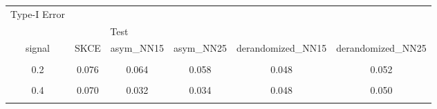 \begin{table}[!h]
\centering\begingroup\fontsize{5}{7}\selectfont

\begin{tabular}{cccccc}
\toprule
\multicolumn{1}{c}{Type-I Error} \\
\cmidrule(l{3pt}r{3pt}){1-1}
\multicolumn{1}{c}{ } & \multicolumn{2}{c}{Test} \\
\cmidrule(l{3pt}r{3pt}){2-3}
signal & SKCE & asym_NN15 & asym_NN25 & derandomized_NN15 & derandomized_NN25\\
\midrule
\cellcolor{gray!10}{0.1} & \cellcolor{gray!10}{0.076} & \cellcolor{gray!10}{0.058} & \cellcolor{gray!10}{0.050} & \cellcolor{gray!10}{0.046} & \cellcolor{gray!10}{0.052}\\
0.2 & 0.076 & 0.064 & 0.058 & 0.048 & 0.052\\
\cellcolor{gray!10}{0.3} & \cellcolor{gray!10}{0.070} & \cellcolor{gray!10}{0.038} & \cellcolor{gray!10}{0.044} & \cellcolor{gray!10}{0.048} & \cellcolor{gray!10}{0.040}\\
0.4 & 0.070 & 0.032 & 0.034 & 0.048 & 0.050\\
\cellcolor{gray!10}{0.5} & \cellcolor{gray!10}{0.076} & \cellcolor{gray!10}{0.046} & \cellcolor{gray!10}{0.050} & \cellcolor{gray!10}{0.030} & \cellcolor{gray!10}{0.044}\\
\bottomrule
\end{tabular}
\endgroup{}
\end{table}

